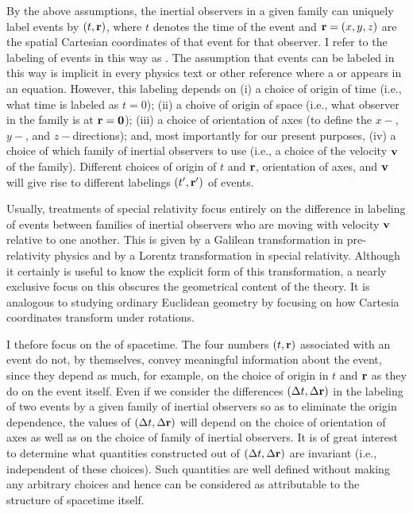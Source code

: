 By the above assumptions, the inertial observers in a given family can uniquely label events by $(t, \vb{r})$, where $t$ denotes the time of the event and $\vb{r} = (x, y, z)$ are the spatial Cartesian coordinates of that event for that observer. I refer to the labeling of events in this way as . The assumption that events can be labeled in this way is implicit in every physics text or other reference where a  or  appears in an equation. However, this labeling depends on (i) a choice of origin of time (i.e., what time is labeled as $t=0$); (ii) a choive of origin of space (i.e., what observer in the family is at $\vb{r}= \vb{0}$); (iii) a choice of orientation of axes (to define the $x-$, $y-$, and $z-$directions); and, most importantly for our present purposes, (iv) a choice of which family of inertial observers to use (i.e., a choice of the velocity $\vb{v}$ of the family). Different choices of origin of $t$ and $\vb{r}$, orientation of axes, and $\vb{v}$ will give rise to different labelings $(t', \vb{r}')$ of events. 

Usually, treatments of special relativity focus entirely on the difference in labeling of events between families of inertial observers who are moving with velocity $\vb{v}$ relative to one another. This is given by a Galilean transformation in pre-relativity physics and by a Lorentz transformation in special relativity. Although it certainly is useful to know the explicit form of this transformation, a nearly exclusive focus on this obscures the geometrical content of the theory. It is analogous to studying ordinary Euclidean geometry by focusing on how Cartesia coordinates transform under rotations. 

I thefore focus on the  of spacetime. The four numbers $(t, \vb{r})$ associated with an event do not, by themselves, convey meaningful information about the event, since they depend as much, for example, on the choice of origin in $t$ and $\vb{r}$ as they do on the event itself. Even if we consider the differences $(\Delta t, \Delta \vb{r})$ in the labeling of two events by a given family of inertial observers so as to eliminate the origin dependence, the values of $(\Delta t, \Delta \vb{r})$ will depend on the choice of orientation of axes as well as on the choice of family of inertial observers. It is of great interest to determine what quantities constructed out of $(\Delta t, \Delta \vb{r})$ are invariant (i.e., independent of these choices). Such quantities are well defined without making any arbitrary choices and hence can be considered as attributable to the structure of spacetime itself. 

